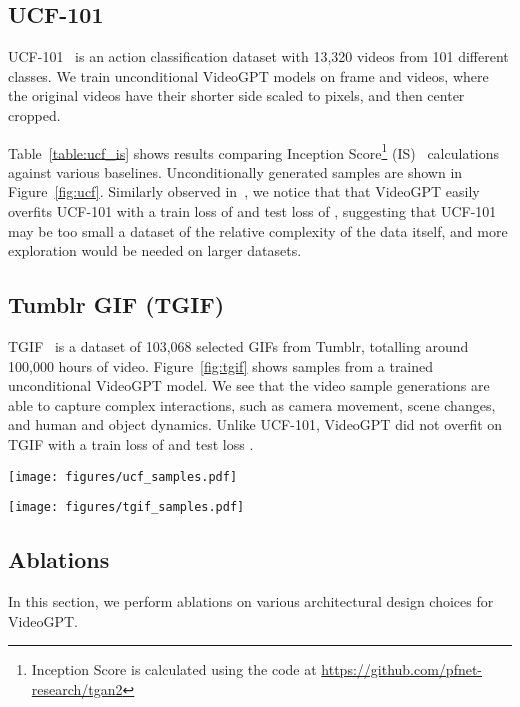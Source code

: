 \documentclass{article}
\begin{document}
\subsection{UCF-101}
UCF-101~\citep{soomro2012ucf101} is an action classification dataset with 13,320 videos from 101 different classes. We train unconditional VideoGPT models on  frame  and  videos, where the original videos have their shorter side scaled to  pixels, and then center cropped. 

Table~\ref{table:ucf_is} shows results comparing Inception Score\footnote{Inception Score is calculated using the code at \url{https://github.com/pfnet-research/tgan2}} (IS)~\citep{salimans2016improved} calculations against various baselines. Unconditionally generated samples are shown in Figure~\ref{fig:ucf}. Similarly observed in~\cite{clark2019adversarial}, we notice that that VideoGPT easily overfits UCF-101 with a train loss of  and test loss of , suggesting that UCF-101 may be too small a dataset of the relative complexity of the data itself, and more exploration would be needed on larger datasets.

\subsection{Tumblr GIF (TGIF)}
TGIF~\citep{li2016tgif} is a dataset of 103,068 selected GIFs from Tumblr, totalling around 100,000 hours of video. Figure~\ref{fig:tgif} shows samples from a trained unconditional VideoGPT model. We see that the video sample generations are able to capture complex interactions, such as camera movement, scene changes, and human and object dynamics. Unlike UCF-101, VideoGPT did not overfit on TGIF with a train loss of  and test loss .

\begin{figure*}[ht]
\begin{minipage}{\textwidth}
        \centering
    \texttt{[image: figures/ucf\_samples.pdf]}
    \caption{ UCF-101 unconditional samples}
    \label{fig:ucf}
\end{minipage}
\begin{minipage}{\textwidth}
        \centering
    \texttt{[image: figures/tgif\_samples.pdf]}
    \caption{ TGIF unconditional samples}
    \label{fig:tgif}
\end{minipage}


\end{figure*}

\subsection{Ablations}
In this section, we perform ablations on various architectural design choices for VideoGPT.
\end{document}

